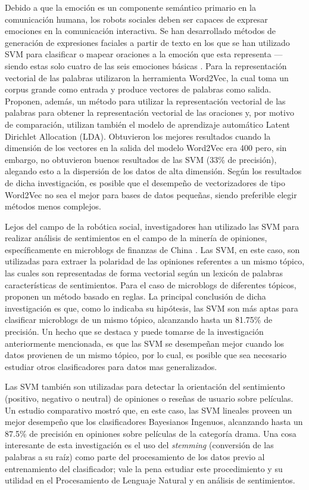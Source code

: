 \documentclass[conference]{IEEEtran}
\begin{document}
    Debido a que la emoción es un componente semántico primario en la comunicación humana, los robots sociales deben ser capaces de expresar emociones en la comunicación interactiva. Se han desarrollado métodos de generación de expresiones faciales a partir de texto en los que se han utilizado SVM para clasificar o mapear oraciones a la emoción que esta representa \cite{bai2014asentiment} --- siendo estas solo cuatro de las seis emociones básicas \cite{scherer1979nonlinguistic}. Para la representación vectorial de las palabras utilizaron la herramienta Word2Vec, la cual toma un corpus grande como entrada y produce vectores de palabras como salida. Proponen, además, un método para utilizar la representación vectorial de las palabras para obtener la representación vectorial de las oraciones y, por motivo de comparación, utilizan también el modelo de aprendizaje automático Latent Dirichlet Allocation (LDA). Obtuvieron los mejores resultados cuando la dimensión de los vectores en la salida del modelo Word2Vec era 400 pero, sin embargo, no obtuvieron buenos resultados de las SVM (33\% de precisión), alegando esto a la dispersión de los datos de alta dimensión. Según los resultados de dicha investigación, es posible que el desempeño de vectorizadores de tipo Word2Vec no sea el mejor para bases de datos pequeñas, siendo preferible elegir métodos menos complejos.
    
    Lejos del campo de la robótica social, investigadores han utilizado las SVM para realizar análisis de sentimientos en el campo de la minería de opiniones, específicamente en microblogs de finanzas de China \cite{yan2018sentiment}. Las SVM, en este caso, son utilizadas para extraer la polaridad de las opiniones referentes a un mismo tópico, las cuales son representadas de forma vectorial según un lexicón de palabras características de sentimientos. Para el caso de microblogs de diferentes tópicos, proponen un método basado en reglas. La principal conclusión de dicha investigación es que, como lo indicaba su hipótesis, las SVM son más aptas para clasificar microblogs de un mismo tópico, alcanzando hasta un 81.75\% de precisión. Un hecho que se destaca y puede tomarse de la investigación anteriormente mencionada, es que las SVM se desempeñan mejor cuando los datos provienen de un mismo tópico, por lo cual, es posible que sea necesario estudiar otros clasificadores para datos mas generalizados.

    Las SVM también son utilizadas para detectar la orientación del sentimiento (positivo, negativo o neutral) de opiniones o reseñas de usuario sobre películas. Un estudio comparativo mostró que, en este caso, las SVM lineales proveen un mejor desempeño que los clasificadores Bayesianos Ingenuos, alcanzando hasta un 87.5\% de precisión \cite{rana2016comparative} en opiniones sobre películas de la categoría drama. Una cosa interesante de esta investigación es el uso del \textit{stemming} (conversión de las palabras a su raíz) como parte del procesamiento de los datos previo al entrenamiento del clasificador; vale la pena estudiar este procedimiento y su utilidad en el Procesamiento de Lenguaje Natural y en análisis de sentimientos.
    
\end{document}
